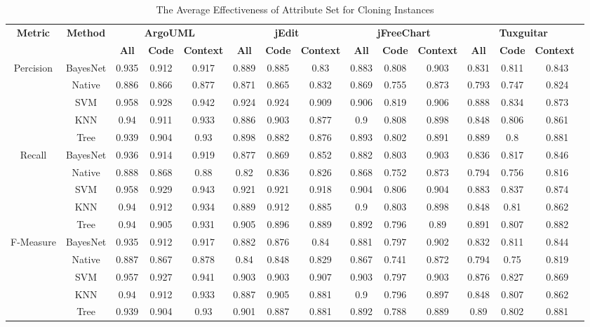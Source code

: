 \begin{table*}[ht]
\scriptsize
\caption{The Average Effectiveness of Attribute Set for Cloning Instances}
\label{cloningsetavg}
\centering
\begin{tabular}{|c|c|c|c|c|c|c|c|c|c|c|c|c|c|}
\hline
\multirow{2}{*}{\textbf{Metric}}&\multirow{2}{*}{\textbf{Method}}&\multicolumn{3}{|c|}{\textbf{ArgoUML}}&\multicolumn{3}{|c|}{\textbf{jEdit}}&\multicolumn{3}{|c|}{\textbf{jFreeChart}}&\multicolumn{3}{|c|}{\textbf{Tuxguitar}}\\
\cline{3-14}
&&\textbf{All}&\textbf{Code}&\textbf{Context}&\textbf{All}&\textbf{Code}&\textbf{Context}&\textbf{All}&\textbf{Code}&\textbf{Context}&\textbf{All}&\textbf{Code}&\textbf{Context}~\\
\hline
\multirow{5}{*}{Percision}
&BayesNet&	0.935&	0.912&	0.917&		0.889&	0.885&	0.83&		0.883&	0.808&	0.903&		0.831&	0.811&	0.843\\
&Native&	0.886&	0.866&	0.877&		0.871&	0.865&	0.832&		0.869&	0.755&	0.873&		0.793&	0.747&	0.824\\
&SVM&	0.958&	0.928&	0.942&		0.924&	0.924&	0.909&		0.906&	0.819&	0.906&		0.888&	0.834&	0.873\\
&KNN&	0.94&	0.911&	0.933&		0.886&	0.903&	0.877&		0.9	&0.808&	0.898&		0.848&	0.806&	0.861\\
&Tree&	0.939&	0.904&	0.93&		0.898&	0.882&	0.876&		0.893&	0.802&	0.891&		0.889&	0.8&	0.881\\
\hline
\multirow{5}{*}{Recall}
&BayesNet&	0.936&	0.914&	0.919&		0.877&	0.869&	0.852&		0.882&	0.803&	0.903&		0.836&	0.817&	0.846\\
&Native&	0.888&	0.868&	0.88&		0.82&	0.836&	0.826&		0.868&	0.752&	0.873&		0.794&	0.756&	0.816\\
&SVM&	0.958&	0.929&	0.943&		0.921&	0.921&	0.918&		0.904&	0.806&	0.904&		0.883&	0.837&	0.874\\
&KNN&	0.94&	0.912&	0.934&		0.889&	0.912&	0.885&		0.9&	0.803&	0.898&		0.848&	0.81&	0.862\\
&Tree&	0.94&	0.905&	0.931&		0.905&	0.896&	0.889&		0.892&	0.796&	0.89&		0.891&	0.807&	0.882\\
\hline
\multirow{5}{*}{F-Measure}
&BayesNet&	0.935&	0.912&	0.917&		0.882&	0.876&	0.84&		0.881&	0.797&	0.902&		0.832&	0.811&	0.844\\
&Native&	0.887&	0.867&	0.878&		0.84&	0.848&	0.829&		0.867&	0.741&	0.872&		0.794&	0.75&	0.819\\
&SVM&	0.957&	0.927&	0.941&		0.903&	0.903&	0.907&		0.903&	0.797&	0.903&		0.876&	0.827&	0.869\\
&KNN&	0.94&	0.912&	0.933&		0.887&	0.905&	0.881&		0.9&	0.796&	0.897&		0.848&	0.807&	0.862\\
&Tree&	0.939&	0.904&	0.93&		0.901&	0.887&	0.881&		0.892&	0.788&	0.889&		0.89&	0.802&	0.881\\
\hline
\end{tabular}
\end{table*}


